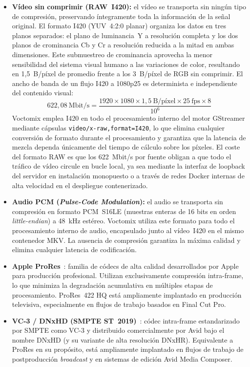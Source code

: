 \begin{itemize}
  \item \textbf{Vídeo sin comprimir (RAW~I420):} el vídeo se transporta sin ningún tipo
  de compresión, preservando íntegramente toda la información de la señal original. El
  formato I420 (YUV~4:2:0 planar) organiza los datos en tres planos separados: el plano
  de luminancia~Y a resolución completa y los dos planos de crominancia Cb y Cr a
  resolución reducida a la mitad en ambas dimensiones. Este submuestreo de crominancia
  aprovecha la menor sensibilidad del sistema visual humano a las variaciones de color,
  resultando en 1{,}5~B/píxel de promedio frente a los 3~B/píxel de RGB sin comprimir.
  El ancho de banda de un flujo I420 a 1080p25 es determinista e independiente del
  contenido visual:
  \[
    622{,}08~\text{Mbit/s}
    = \frac{1920 \times 1080 \times 1{,}5~\text{B/píxel} \times 25~\text{fps} \times 8}{10^6}
  \]
  Voctomix emplea I420 en todo el procesamiento interno del motor GStreamer mediante
  cápsulas \texttt{video/x-raw,format=I420}, lo que elimina cualquier conversión de
  formato durante el procesamiento y garantiza que la latencia de mezcla dependa
  únicamente del tiempo de cálculo sobre los píxeles. El coste del formato RAW es que los
  622~Mbit/s por fuente obligan a que todo el tráfico de vídeo circule en bucle local,
  ya sea mediante la interfaz de loopback del servidor en instalación monopuesto o a
  través de redes Docker internas de alta velocidad en el despliegue contenerizado.

  \item \textbf{Audio PCM (\textit{Pulse-Code Modulation}):} el audio se transporta sin
  compresión en formato PCM~S16LE (muestras enteras de 16 bits en orden
  \textit{little-endian}) a 48~kHz estéreo. Voctomix utiliza este formato para todo el
  procesamiento interno de audio, encapsulado junto al vídeo~I420 en el mismo contenedor
  MKV. La ausencia de compresión garantiza la máxima calidad y elimina cualquier
  latencia de codificación.

  \item \textbf{Apple ProRes}~\cite{apple_prores}: familia de códecs de alta calidad
  desarrollados por Apple para producción profesional. Utilizan exclusivamente compresión
  intra-frame, lo que minimiza la degradación acumulativa en múltiples etapas de
  procesamiento. ProRes~422 HQ está ampliamente implantado en producción televisiva,
  especialmente en flujos de trabajo basados en Final Cut Pro.

  \item \textbf{VC-3 / DNxHD (SMPTE ST~2019)}~\cite{smpte_vc3,avid_dnxhd}: códec
  intra-frame estandarizado por SMPTE como VC-3 y distribuido comercialmente por Avid
  bajo el nombre DNxHD (y su variante de alta resolución DNxHR). Equivalente a ProRes
  en su propósito, está ampliamente implantado en flujos de trabajo de postproducción
  \textit{broadcast} y en sistemas de edición Avid Media Composer.


\end{itemize}
